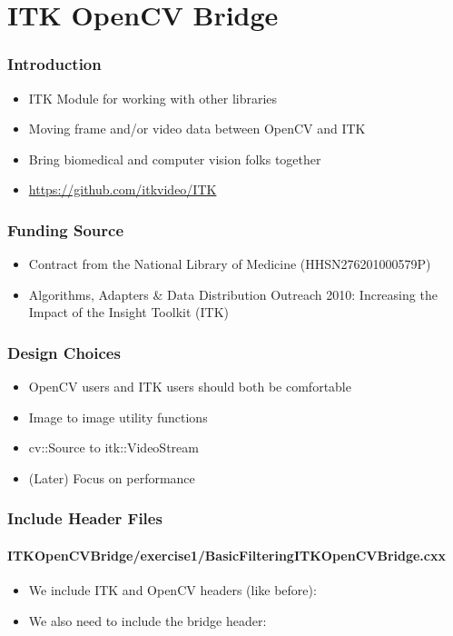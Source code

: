 \section{ITK OpenCV Bridge}



\begin{frame}
\frametitle{Introduction}
\begin{itemize}
\item ITK Module for working with other libraries
\item Moving frame and/or video data between OpenCV and ITK
\item Bring biomedical and computer vision folks together
\item \url{https://github.com/itkvideo/ITK}
\end{itemize}
\end{frame}

\begin{frame}
\frametitle{Funding Source}
\begin{itemize}
\item Contract from the National Library of Medicine (HHSN276201000579P)
\item Algorithms, Adapters \& Data Distribution Outreach 2010:
  Increasing the Impact of the Insight Toolkit (ITK)
\end{itemize}
\end{frame}

\begin{frame}
\frametitle{Design Choices}
\begin{itemize}
\item OpenCV users and ITK users should both be comfortable
\item Image to image utility functions
\item cv::Source to itk::VideoStream
\item (Later) Focus on performance
\end{itemize}
\end{frame}


\begin{frame}
\frametitle{Include Header Files}
\framesubtitle{ITKOpenCVBridge/exercise1/BasicFilteringITKOpenCVBridge.cxx}
\begin{itemize}
\item We include ITK and OpenCV headers (like before):
\item We also need to include the bridge header:
\end{itemize}
\end{frame}

